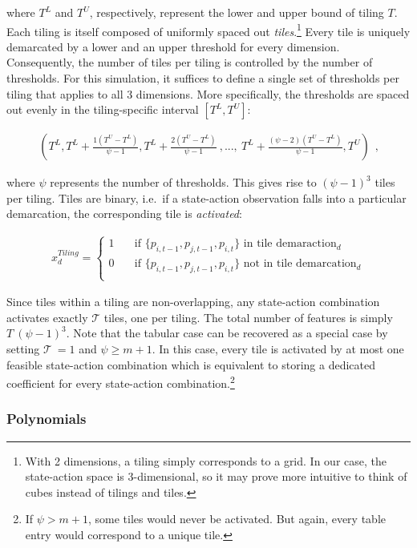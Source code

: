 where $T^L$ and $T^U$, respectively, represent the lower and upper bound of tiling $T$. Each tiling is itself composed of uniformly spaced out \emph{tiles}.\footnote{With 2 dimensions, a tiling simply corresponds to a grid. In our case, the state-action space is 3-dimensional, so it may prove more intuitive to think of cubes instead of tilings and tiles.} Every tile is uniquely demarcated by a lower and an upper threshold for every dimension. Consequently, the number of tiles per tiling is controlled by the number of thresholds. For this simulation, it suffices to define a single set of thresholds per tiling that applies to all 3 dimensions. More specifically, the thresholds are spaced out evenly in the tiling-specific interval $[T^L, T^U]$:

\begin{gather}
(
T^L,
T^L + \frac{1(T^U - T^L)}{\psi - 1},
T^L + \frac{2(T^U - T^L)}{\psi - 1}~ , ... , ~
T^L + \frac{(\psi-2)(T^U - T^L)}{\psi - 1},
T^U) ~~ \text{,}
\end{gather}

where $\psi$ represents the number of thresholds. This gives rise to $(\psi-1)^3$ tiles per tiling. Tiles are binary, i.e.\ if a state-action observation falls into a particular demarcation, the corresponding tile is \emph{activated}:

\begin{gather}\label{tile_activation}
x_d^{Tiling} = \begin{cases}
1 & \quad \text{if } \{p_{i, t-1}, p_{j, t-1}, p_{i, t}\} \text{~in tile demaraction}_d  \\
0 & \quad \text{if } \{p_{i, t-1}, p_{j, t-1}, p_{i, t}\} \text{~not in tile demarcation}_d \\ \end{cases} 
\end{gather}

Since tiles within a tiling are non-overlapping, any state-action combination activates exactly $\mathcal{T}$ tiles, one per tiling. The total number of features is simply $T~(\psi - 1)^3$. Note that the tabular case can be recovered as a special case by setting $\mathcal{T}~ = 1$ and $\psi \geq m + 1$. In this case, every tile is activated by at most one feasible state-action combination which is equivalent to storing a dedicated coefficient for every state-action combination.\footnote{If $\psi > m + 1$, some tiles would never be activated. But again, every table entry would correspond to a unique tile.}


\subsubsection{Polynomials}\label{polynomial}

